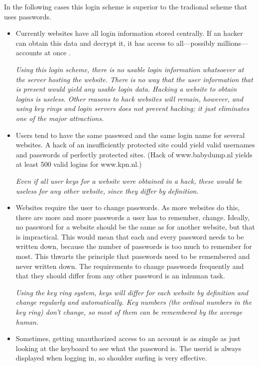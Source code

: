 In the following cases this login scheme is superior to the tradional scheme that uses passwords.
\begin{itemize}
\item Currently websites have all login information stored centrally.
If an hacker can obtain this data and decrypt it,
it has access to all---possibly millions---accounts at once \cite{wiki:linkedin}.
\par
\emph{Using this login scheme,
there is no usable login information whatsoever at the server hosting the website.
There is no way that the user information that \emph{is} present would yield any usable login data.
Hacking a website to obtain logins is useless.
\newline
Other reasons to hack websites will remain,
however,
and using key rings and login servers does not prevent hacking;
it just eliminates one of the major attractions.}
\item Users tend to have the same password and the same login name for several websites.
A hack of an insufficiently protected site could yield valid usernames and passwords of perfectly protected sites.
(Hack of www.babydump.nl yields at least 500 valid logins for www.kpn.nl.)
\par
\emph{Even if all user keys for a website were obtained in a hack,
these would be useless for any other website,
since they differ by definition.}
\item Websites require the user to change passwords.
As more websites do this,
there are more and more passwords a user has to remember,
change.
Ideally,
no password for a website should be the same as for another website,
but that is impractical.
This would mean that each and every password needs to be written down,
because the number of passwords is too much to remember for most.
This thwarts the principle that passwords need to be remembered and never written down.
The requirements to change passwords frequently and that they should differ from any other password is an inhuman task.
\par
\emph{Using the key ring system,
keys will differ for each website by definition and change regularly and automatically.
Key numbers
(the ordinal numbers in the key ring)
don't change,
so most of them can be remembered by the average human.}
\item Sometimes,
getting unauthorized access to an account is as simple as just looking at the keyboard to see what the password is.
The userid is always displayed when logging in,
so shoulder surfing is very effective.

\end{itemize}
